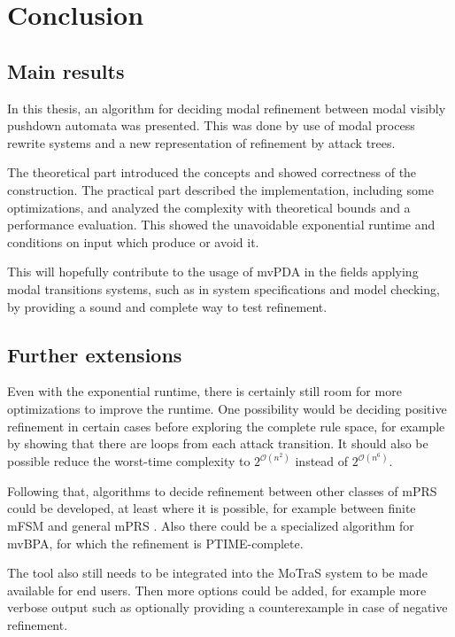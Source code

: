 \chapter{Conclusion}

\section{Main results}

In this thesis, an algorithm for deciding modal refinement
between modal visibly pushdown automata was presented.
This was done by use of modal process rewrite systems
and a new representation of refinement by attack trees.

The theoretical part introduced the concepts and showed
correctness of the construction.
The practical part described the implementation,
including some optimizations, and analyzed the
complexity with theoretical bounds and a performance evaluation.
This showed the unavoidable exponential runtime and
conditions on input which produce or avoid it.

This will hopefully contribute to the usage of mvPDA
in the fields applying modal transitions systems, such as in
system specifications and model checking, by providing
a sound and complete way to test refinement.

\section{Further extensions}

Even with the exponential runtime, there is certainly
still room for more optimizations to improve the runtime.
One possibility would be deciding positive refinement in certain cases before
exploring the complete rule space, for example by showing that there are
loops from each attack transition.
It should also be possible reduce the worst-time complexity
to $2^{\mathcal O(n^2)}$ instead of $2^{\mathcal O(n^6)}$.

Following that, algorithms to decide 
refinement between other classes of mPRS could be developed,
at least where it is possible, for example
between finite mFSM and general mPRS \cite{BenesK12}. Also there could be a
specialized algorithm for mvBPA, for which the refinement is PTIME-complete.

The tool also still needs to be integrated into the MoTraS system to be made
available for end users. Then more options could be added, for example
more verbose output such as optionally providing a counterexample
in case of negative refinement.

